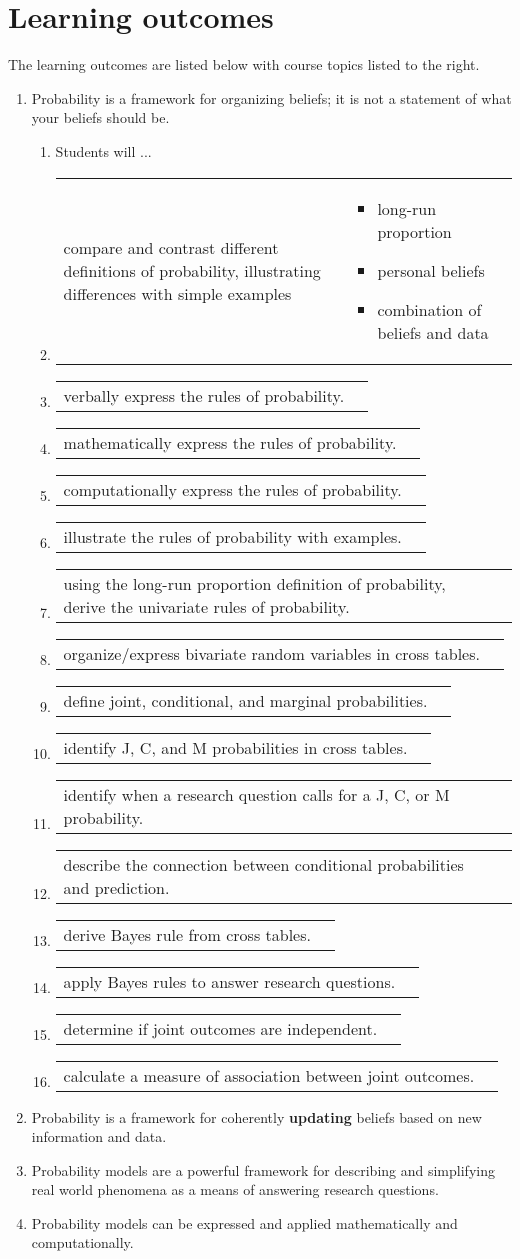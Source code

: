 \documentclass{article}
\newcommand{\lot}[2]{
    \begin{tabular}[t]{p{.60\linewidth}p{.30\linewidth}}\raggedright
        #1 & \begin{minipage}[t]{\linewidth}\raggedright
            \begin{itemize}  \setlength\itemsep{0em}
                #2
            \end{itemize}
        \end{minipage}
    \end{tabular}
}
\newcommand{\lo}[1]{
    \begin{tabular}[t]{p{.60\linewidth}p{.30\linewidth}}\raggedright
        #1 & 
    \end{tabular}
}
\begin{document}
\section*{Learning outcomes}
The learning outcomes are listed below with course topics listed to the right.
\begin{enumerate}
    \item Probability is a framework for organizing beliefs; it is not a statement of what your beliefs should be.

    \begin{enumerate}
        \item[] \hspace*{\dimexpr-\labelsep-\labelwidth}Students will ...
        \item \lot{compare and contrast different definitions of probability, illustrating differences with simple examples}{\item long-run proportion \item personal beliefs \item combination of beliefs and data}
        \item \lo{verbally express the rules of probability.}
        \item \lo{mathematically express the rules of probability.}
        \item \lo{computationally express the rules of probability.}
        \item \lo{illustrate the rules of probability with examples.}
        \item \lo{using the long-run proportion definition of probability, derive the univariate rules of probability.}
        \item \lo{organize/express bivariate random variables in cross tables.}
        \item \lo{define joint, conditional, and marginal probabilities.}
        \item \lo{identify J, C, and M probabilities in cross tables.}
        \item \lo{identify when a research question calls for a J, C, or M probability.}
        \item \lo{describe the connection between conditional probabilities and prediction.}
        \item \lo{derive Bayes rule from cross tables.}
        \item \lo{apply Bayes rules to answer research questions.}
        \item \lo{determine if joint outcomes are independent.}
        \item \lo{calculate a measure of association between joint outcomes.}
    \end{enumerate}
    \item Probability is a framework for coherently {\bf updating} beliefs based on new information and data.
    \item Probability models are a powerful framework for describing and simplifying real world phenomena as a means of answering research questions.
    \item Probability models can be expressed and applied mathematically and computationally.
\end{enumerate}
\end{document}
